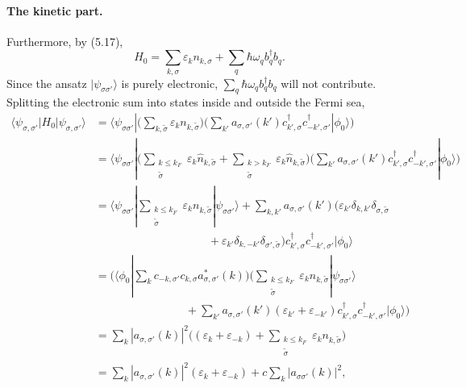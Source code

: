 \documentclass[../../main.tex]{subfiles}
\begin{document}
\paragraph{The kinetic part.}
Furthermore, by (5.17),
\begin{equation}
H_0=\sum_{k,\sigma}\varepsilon_k n_{k,\sigma}+\sum_q\hbar\omega_q b^\dagger_q b_q .
\end{equation}
Since the ansatz $|\psi_{\sigma\sigma'}\rangle$ is purely electronic,
$\sum_q\hbar\omega_q b^\dagger_q b_q$ will not contribute. Splitting the electronic sum
into states inside and outside the Fermi sea,
\begin{align}
\langle\psi_{\sigma,\sigma'}|H_0|\psi_{\sigma,\sigma'}\rangle
&=\langle\psi_{\sigma\sigma'}|\Big(\sum_{k,\tilde\sigma}
  \varepsilon_k n_{k,\tilde\sigma}\Big)
  \Big(\sum_{k'}a_{\sigma,\sigma'}(k')c^\dagger_{k',\sigma}
  c^\dagger_{-k',\sigma'}|\phi_0\rangle\Big)\\
&=\langle\psi_{\sigma\sigma'}|\Big(\sum_{\substack{k\le k_F\\ \tilde\sigma}}
  \varepsilon_k\hat n_{k,\tilde\sigma}
  +\sum_{\substack{k>k_F\\ \tilde\sigma}}\varepsilon_k\hat n_{k,\tilde\sigma}\Big)
  \Big(\sum_{k'}a_{\sigma,\sigma'}(k')c^\dagger_{k',\sigma}
  c^\dagger_{-k',\sigma'}|\phi_0\rangle\Big)\\
&=\langle\psi_{\sigma\sigma'}|\sum_{\substack{k\le k_F\\ \tilde\sigma}}
  \varepsilon_k n_{k,\tilde\sigma}|\psi_{\sigma\sigma'}\rangle
  +\sum_{k,k'}a_{\sigma,\sigma'}(k')\big(\varepsilon_{k'}\delta_{k,k'}
  \delta_{\sigma,\tilde\sigma}\nonumber\\
&\hspace{10em}
  +\varepsilon_{k'}\delta_{k,-k'}\delta_{\sigma',\tilde\sigma}\big)
  c^\dagger_{k',\sigma}c^\dagger_{-k',\sigma'}|\phi_0\rangle\\
&=\Big(\langle\phi_0|\sum_k c_{-k,\sigma'}c_{k,\sigma}a^*_{\sigma,\sigma'}(k)\Big)
  \Big(\sum_{\substack{k\le k_F\\ \tilde\sigma}}\varepsilon_k n_{k,\tilde\sigma}
  |\psi_{\sigma\sigma'}\rangle\nonumber\\
&\hspace{8em}
  +\sum_{k'}a_{\sigma,\sigma'}(k')(\varepsilon_{k'}+\varepsilon_{-k'})
  c^\dagger_{k',\sigma}c^\dagger_{-k',\sigma'}|\phi_0\rangle\Big)\\
&=\sum_k|a_{\sigma,\sigma'}(k)|^2\Big((\varepsilon_k+\varepsilon_{-k})
  +\sum_{\substack{k\le k_F\\ \tilde\sigma}}\varepsilon_k n_{k,\tilde\sigma}\Big)\\
&=\sum_k|a_{\sigma,\sigma'}(k)|^2(\varepsilon_k+\varepsilon_{-k})
  +c\sum_k|a_{\sigma\sigma'}(k)|^2 ,
\end{align}
\end{document}
